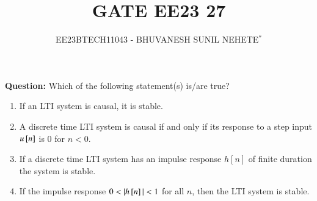\documentclass[journal,12pt,twocolumn]{IEEEtran}
\theoremstyle{remark}
\begin{document}

\vspace{3cm}

\title{GATE EE23 27}
\author{EE23BTECH11043 - BHUVANESH SUNIL NEHETE$^{*}$%
}
\maketitle
\newpage
\bigskip

\renewcommand{\thefigure}{\theenumi}
\renewcommand{\thetable}{\theenumi}



\textbf{Question:}
Which of the following statement(s) is/are true?
\begin{enumerate}[label=\alph*)]
    \item If an LTI system is causal, it is stable.
    \item A discrete time LTI system is causal if and only if its response to a step input $u{}\left[n\right]$ is 0 for $n<0$.
    \item If a discrete time LTI system has an impulse response $h[n]$ of finite duration the system is stable.
    \item If the impulse response $0<|h\sbrak{n}|<1$ for all $n$, then the LTI system is stable.
\end{enumerate}
\solution
\end{document}
